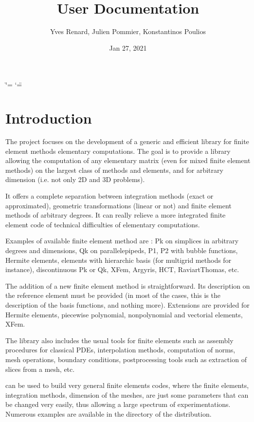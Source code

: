 \documentclass[a4paper,11pt,english]{sphinxmanual}
\title{User Documentation}
\date{Jan 27, 2021}
\author{Yves Renard, Julien Pommier, Konstantinos Poulios}
\begin{document}
\ifdefined\shorthandoff
  \ifnum\catcode`\=\string=\active\shorthandoff{=}\fi
  \ifnum\catcode`\"=\active{}\fi
\fi

\pagestyle{empty}
\sphinxmaketitle
\pagestyle{plain}
\sphinxtableofcontents
\pagestyle{normal}
\label{\detokenize{userdoc/index::doc}}



\chapter{Introduction}
\label{\detokenize{userdoc/intro:introduction}}\label{\detokenize{userdoc/intro:ud-intro}}\label{\detokenize{userdoc/intro::doc}}
The  project focuses on the development of a generic and
efficient  library for finite element methods elementary
computations. The goal is to provide a library allowing the
computation of any elementary matrix (even for mixed finite element
methods) on the largest class of methods and elements, and for
arbitrary dimension (i.e. not only 2D and 3D problems).

It offers a complete separation between integration methods (exact or
approximated), geometric transformations (linear or not) and finite
element methods of arbitrary degrees. It can really relieve a more
integrated finite element code of technical difficulties of
elementary computations.

Examples of available finite element method are : Pk on simplices in
arbitrary degrees and dimensions, Qk on parallelepipeds, P1, P2 with
bubble functions, Hermite elements, elements with hierarchic basis
(for multigrid methods for instance), discontinuous Pk or Qk, XFem,
Argyris, HCT, Raviart\sphinxhyphen{}Thomas, etc.

The addition of a new finite element method is straightforward. Its
description on the reference element must be provided (in most of the
cases, this is the description of the basis functions, and nothing
more). Extensions are provided for Hermite elements, piecewise
polynomial, non\sphinxhyphen{}polynomial and vectorial elements, XFem.

The library also includes the usual tools for finite elements such as
assembly procedures for classical PDEs, interpolation methods,
computation of norms, mesh operations, boundary conditions,
post\sphinxhyphen{}processing tools such as extraction of slices from a mesh, etc.

 can be used to build very general finite elements codes, where
the finite elements, integration methods, dimension of the meshes,
are just some parameters that can be changed very easily, thus
allowing a large spectrum of experimentations. Numerous examples are
available in the  directory of the distribution.
\end{document}
